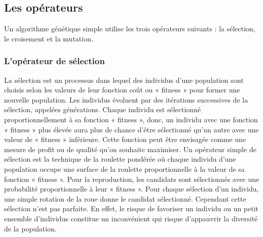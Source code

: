 \documentclass[12pt,a4paper]{article}
\begin{document}
	\newpage
	
	\subsection{Les opérateurs}
		Un algorithme génétique simple utilise les trois opérateurs suivants : la sélection, le croisement et la mutation.
		\subsubsection{L’opérateur de sélection}
		La sélection est un processus dans lequel des individus d’une population sont choisis selon les valeurs de leur fonction coût ou «  fitness  » pour former une nouvelle population. Les individus évoluent par des itérations successives de la sélection, appelées générations. Chaque individu est sélectionné proportionnellement à sa fonction « fitness », donc, un individu avec une fonction « fitness »
plus élevée aura plus de chance d’être sélectionné qu’un autre avec une valeur de « fitness » inférieure. Cette fonction peut être envisagée comme une mesure de profit ou de qualité qu’on souhaite maximiser. Un opérateur simple de sélection est la technique de la roulette pondérée où chaque individu d’une population
occupe une surface de la roulette proportionnelle à la valeur de sa fonction « fitness ». Pour la reproduction, les candidats sont sélectionnés avec une probabilité proportionnelle à leur «  fitness  ». Pour chaque sélection d’un
individu, une simple rotation de la roue donne le candidat sélectionné. Cependant cette sélection n’est pas parfaite. En effet, le risque de favoriser un individu ou un petit ensemble d’individus constitue un inconvénient qui risque d’appauvrir la diversité de la population.
\end{document}
